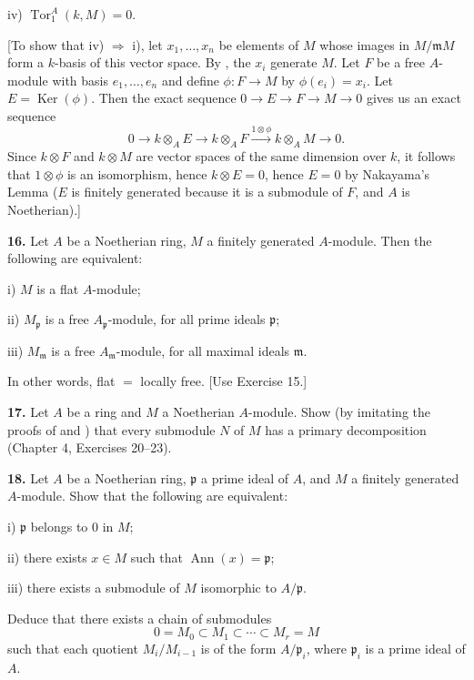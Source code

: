 iv) $\operatorname{Tor}_1^A(k,M)=0$.

[To show that iv) $\Rightarrow$ i), let $x_1,\ldots,x_n$ be elements of $M$ whose images in $M/\mathfrak mM$
form a $k$-basis of this vector space.  By , the $x_i$ generate $M$.  Let $F$ be a free
$A$-module with basis $e_1,\ldots,e_n$ and define $\phi:F\longrightarrow M$ by $\phi(e_i)=x_i$.  Let $E=\operatorname{Ker}
(\phi)$.  Then the exact sequence $0\longrightarrow E\longrightarrow F\longrightarrow M\longrightarrow0$ gives us an exact sequence
\[
0\longrightarrow k\otimes_A E\longrightarrow k\otimes_A F\xrightarrow{1\otimes\phi}k\otimes_A M\longrightarrow0.
\]
Since $k\otimes F$ and $k\otimes M$ are vector spaces of the same dimension over $k$, it
follows that $1\otimes\phi$ is an isomorphism, hence $k\otimes E=0$, hence $E=0$ by
Nakayama's Lemma ($E$ is finitely generated because it is a submodule of $F$, and $A$
is Noetherian).]

\medskip
\noindent\amstar\textbf{16.} Let $A$ be a Noetherian ring, $M$ a finitely generated $A$-module.  Then the following
are equivalent:

i) $M$ is a flat $A$-module;

ii) $M_\mathfrak p$ is a free $A_\mathfrak p$-module, for all prime ideals $\mathfrak p$;

iii) $M_\mathfrak m$ is a free $A_\mathfrak m$-module, for all maximal ideals $\mathfrak m$.

In other words, flat $={}$ locally free.  [Use Exercise 15.]

\medskip
\noindent\textbf{17.} Let $A$ be a ring and $M$ a Noetherian $A$-module.  Show (by imitating the proofs
of  and ) that every submodule $N$ of $M$ has a primary decomposition
(Chapter 4, Exercises 20--23).

\medskip
\noindent\textbf{18.} Let $A$ be a Noetherian ring, $\mathfrak p$ a prime ideal of $A$, and $M$ a finitely generated
$A$-module.  Show that the following are equivalent:

i) $\mathfrak p$ belongs to 0 in $M$;

ii) there exists $x\in M$ such that $\operatorname{Ann}(x)=\mathfrak p$;

iii) there exists a submodule of $M$ isomorphic to $A/\mathfrak p$.

Deduce that there exists a chain of submodules
\[
0=M_0\subset M_1\subset\cdots\subset M_r=M
\]
such that each quotient $M_i/M_{i-1}$ is of the form $A/\mathfrak p_i$, where $\mathfrak p_i$ is a prime ideal
of $A$.

